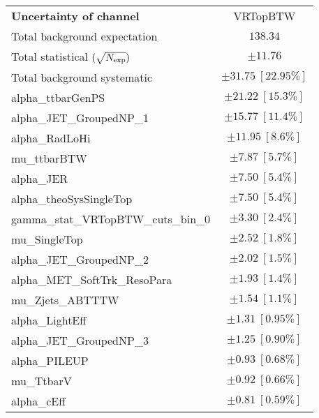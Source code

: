 
\begin{table}
\begin{center}
\setlength{\tabcolsep}{0.0pc}
\begin{tabular*}{\textwidth}{@{\extracolsep{\fill}}lc}
\noalign{\smallskip}\hline\noalign{\smallskip}
{\bf Uncertainty of channel}                                    & VRTopBTW            \\
\noalign{\smallskip}\hline\noalign{\smallskip}
Total background expectation             &  $138.34$       \\
\noalign{\smallskip}\hline\noalign{\smallskip}
Total statistical $(\sqrt{N_{\rm exp}})$              & $\pm 11.76$       \\
Total background systematic               & $\pm 31.75\ [22.95\%] $             \\
\noalign{\smallskip}\hline\noalign{\smallskip}
\noalign{\smallskip}\hline\noalign{\smallskip}
alpha\_ttbarGenPS         & $\pm 21.22\ [15.3\%] $       \\
alpha\_JET\_GroupedNP\_1         & $\pm 15.77\ [11.4\%] $       \\
alpha\_RadLoHi         & $\pm 11.95\ [8.6\%] $       \\
mu\_ttbarBTW         & $\pm 7.87\ [5.7\%] $       \\
alpha\_JER         & $\pm 7.50\ [5.4\%] $       \\
alpha\_theoSysSingleTop         & $\pm 7.50\ [5.4\%] $       \\
gamma\_stat\_VRTopBTW\_cuts\_bin\_0         & $\pm 3.30\ [2.4\%] $       \\
mu\_SingleTop         & $\pm 2.52\ [1.8\%] $       \\
alpha\_JET\_GroupedNP\_2         & $\pm 2.02\ [1.5\%] $       \\
alpha\_MET\_SoftTrk\_ResoPara         & $\pm 1.93\ [1.4\%] $       \\
mu\_Zjets\_ABTTTW         & $\pm 1.54\ [1.1\%] $       \\
alpha\_LightEff         & $\pm 1.31\ [0.95\%] $       \\
alpha\_JET\_GroupedNP\_3         & $\pm 1.25\ [0.90\%] $       \\
alpha\_PILEUP         & $\pm 0.93\ [0.68\%] $       \\
mu\_TtbarV         & $\pm 0.92\ [0.66\%] $       \\
alpha\_cEff         & $\pm 0.81\ [0.59\%] $       \\

\end{tabular*}
\end{center}
\end{table}
